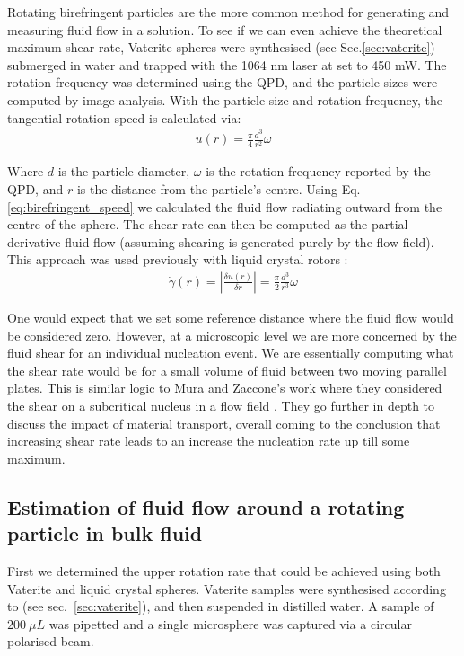Rotating birefringent particles are the more common method for generating 
and measuring fluid flow in a solution. To see if we can even achieve the 
theoretical maximum shear rate, Vaterite spheres were synthesised (see 
Sec.\ref{sec:vaterite}) submerged in water and trapped with the 1064 nm 
laser at set to 450 mW. The rotation frequency was determined using the 
QPD, and the particle sizes were computed by image analysis. With the 
particle size and rotation frequency, the tangential rotation speed is 
calculated via:
\begin{align}
	\label{eq:birefringent_speed}
	u(r) = \frac{\pi}{4}\frac{d^3}{r^2}\omega
\end{align}

Where $d$ is the particle diameter, $\omega$ is the rotation frequency
reported by the QPD, and $r$ is the distance from the particle's centre. 
Using Eq.\ref{eq:birefringent_speed} we calculated the fluid flow radiating
outward from the centre of the sphere. The shear rate can then be computed
as the partial derivative fluid flow (assuming shearing is generated purely
by the flow field). This approach was used previously with liquid crystal 
rotors \cite{Saito2022}:
\begin{align}
	\label{eq:birefringent_shear}
	\dot{\gamma}(r)=\left|\frac{\delta u(r)}{\delta r} \right|= 
	\frac{\pi}{2}\frac{d^3}{r^3}\omega
\end{align}

One would expect that we set some reference distance where the fluid flow 
would be considered zero. However, at a microscopic level we are more 
concerned by the fluid shear for an individual nucleation event. We are
essentially computing what the shear rate would be for a small volume 
of fluid between two moving parallel plates. This is similar logic to Mura 
and Zaccone's work where they considered the shear on a subcritical nucleus
in a flow field \cite{Mura2016}. They go further in depth to discuss the 
impact of material transport, overall coming to the conclusion that 
increasing shear rate leads to an increase the nucleation rate up till some
maximum. 
\subsection{Estimation of fluid flow around a rotating particle in bulk fluid}
First we determined the upper rotation rate that could be achieved 
using both Vaterite and liquid crystal spheres. Vaterite samples 
were synthesised according to \cite{Parkin2009, Bishop2004} (see 
sec.~\ref{sec:vaterite}), and then suspended in distilled water. 
A sample of $200\ \mu L$ was pipetted and a single microsphere was 
captured via a circular polarised beam. 

